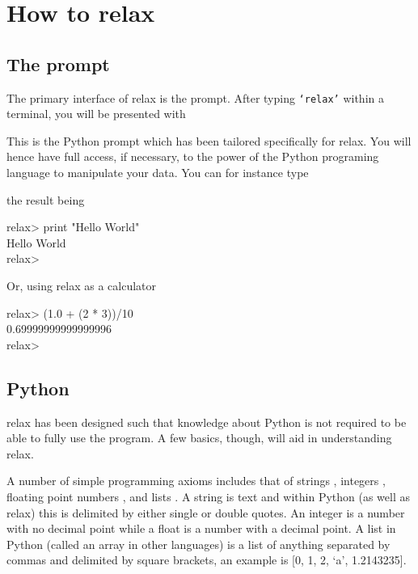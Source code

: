 
\chapter{How to relax}



\section{The prompt}

The primary interface of relax is the prompt.  After typing \texttt{`relax'} within a terminal, you will be presented with


This is the Python prompt which has been tailored specifically for relax.  You will hence have full access, if necessary, to the power of the Python  programing language to manipulate your data.  You can for instance type


the result being

\begin{exampleenv}
relax> print "Hello World" \\
Hello World \\
relax> \\
\end{exampleenv}

Or, using relax as a calculator

\begin{exampleenv}
relax> (1.0 + (2 * 3))/10 \\
0.69999999999999996 \\
relax> \\
\end{exampleenv}




\section{Python}

relax has been designed such that knowledge about Python is not required to be able to fully use the program.  A few basics, though, will aid in understanding relax.

A number of simple programming axioms includes that of strings , integers , floating point numbers , and lists .  A string is text and within Python (as well as relax) this is delimited by either single or double quotes.  An integer is a number with no decimal point while a float is a number with a decimal point.  A list in Python (called an array in other languages) is a list of anything separated by commas and delimited by square brackets, an example is [0, 1, 2, `a', 1.2143235].


